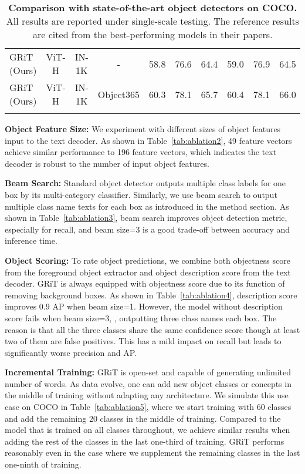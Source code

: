 \documentclass[10pt,twocolumn,letterpaper]{article}
\newcommand{\myparagraph}[1]{{\vspace{0.5em} \noindent \bf #1}}
\begin{document}
\begin{table*}[t!]
\begin{center}
\begin{tabular}{l|c|c|c|ccc|ccc}
			GRiT (Ours)&ViT-H&IN-1K&-&58.8&76.6&64.4&59.0&76.9&64.5\\
			GRiT (Ours)&ViT-H&IN-1K&Object365&60.3&78.1&65.7&60.4&78.1&66.0\\
			\shline
		\end{tabular}
	\end{center}
	\vspace{-5mm}
	\caption{\textbf{Comparison with state-of-the-art object detectors on COCO.} All results are reported under single-scale testing. The reference results are cited from the best-performing models in their papers. }
	\label{tab:sota_od}
	\vspace{-1mm}
\end{table*}

\myparagraph{Object Feature Size:} We experiment with different sizes of object features input to the text decoder. As shown in Table~\ref{tab:ablation2}, 49 feature vectors achieve similar performance to 196 feature vectors, which indicates the text decoder is robust to the number of input object features.

\myparagraph{Beam Search:} Standard object detector outputs multiple class labels for one box by its multi-category classifier. Similarly, we use beam search to output multiple class name texts for each box as introduced in the method section. As shown in Table~\ref{tab:ablation3}, beam search improves object detection metric, especially for recall, and beam size=3 is a good trade-off between accuracy and inference time.

\myparagraph{Object Scoring:} To rate object predictions, we combine both objectness score from the foreground object extractor and object description score from the text decoder. GRiT is always equipped with objectness score due to its function of removing background boxes. As shown in Table~\ref{tab:ablation4}, description score improves 0.9 AP when beam size=1. However, the model without description score fails when beam size=3, \ie, outputting three class names each box. The reason is that all the three classes share the same confidence score though at least two of them are false positives. This has a mild impact on recall but leads to significantly worse precision and AP.

\myparagraph{Incremental Training:} GRiT is open-set and capable of generating unlimited number of words. As data evolve, one can add new object classes or concepts in the middle of training without adapting any architecture. We simulate this use case on COCO in Table~\ref{tab:ablation5}, where we start training with 60 classes and add the remaining 20 classes in the middle of training. Compared to the model that is trained on all classes throughout, we achieve similar results when adding the rest of the classes in the last one-third of training. GRiT performs reasonably even in the case where we supplement the remaining classes in the last one-ninth of training.
\end{document}

